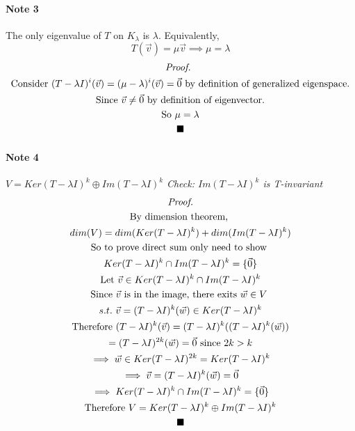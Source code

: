 \documentclass[11pt]{article}
\newcommand{\tx}[1]{\text{{#1}}}
\begin{document}
	\paragraph{Note 3} The only eigenvalue of $T$ on $K_{\lambda}$ is $\lambda$. Equivalently, 
	\[
	T(\vec{v}) = \mu \vec{v} \implies \mu = \lambda
	\]
	\begin{multline*}
		\emph{Proof. }\\
		\text{Consider }(T - \lambda I)^i (\vec{v}) = (\mu - \lambda)^i (\vec{v}) = \vec{0} \text{ by definition of generalized eigenspace.}\\
		\text{Since } \vec{v} \neq \vec{0} \tx{ by definition of eigenvector.}\\
		\tx{So } \mu = \lambda \\
		\blacksquare
	\end{multline*}
	
	\paragraph{Note 4} $V = Ker(T - \lambda I)^k \oplus Im(T - \lambda I)^k$
	\newline
	\emph{Check: $Im(T - \lambda I)^k$ is T-invariant}
	\begin{multline*}
		\emph{Proof.}\\
		\text{By dimension theorem, } \\
		dim(V) = dim(Ker(T - \lambda I)^k) + dim(Im(T - \lambda I)^k) \\
		\text{So to prove direct sum only need to show }\\
		Ker(T - \lambda I)^k \cap Im(T - \lambda I)^k = \{\vec{0}\} \\
		\text{Let } \vec{v} \in Ker(T - \lambda I)^k \cap Im(T - \lambda I)^k\\
		\tx{Since $\vec{v}$ is in the image, there exits $\vec{w} \in V$ } \\
		s.t.\ \vec{v} = (T - \lambda I)^k(\vec{w}) \in Ker(T - \lambda I)^k\\
		\tx{Therefore } (T - \lambda I)^k(\vec{v}) = (T - \lambda I)^k((T - \lambda I)^k(\vec{w})) \\
		= (T - \lambda I)^{2k}(\vec{w}) = \vec{0} \text{ since } 2k > k\\
		\implies \vec{w} \in Ker(T - \lambda I)^{2k} = Ker(T - \lambda I)^k \\
		\implies \vec{v} = (T - \lambda I)^k (\vec{w}) = \vec{0} \\
		\implies Ker(T - \lambda I)^k \cap Im(T - \lambda I)^k = \{\vec{0}\} \\
		\tx{Therefore } V =  Ker(T - \lambda I)^k \oplus Im(T - \lambda I) ^ k \\
		\blacksquare
	\end{multline*}
	
\end{document}
